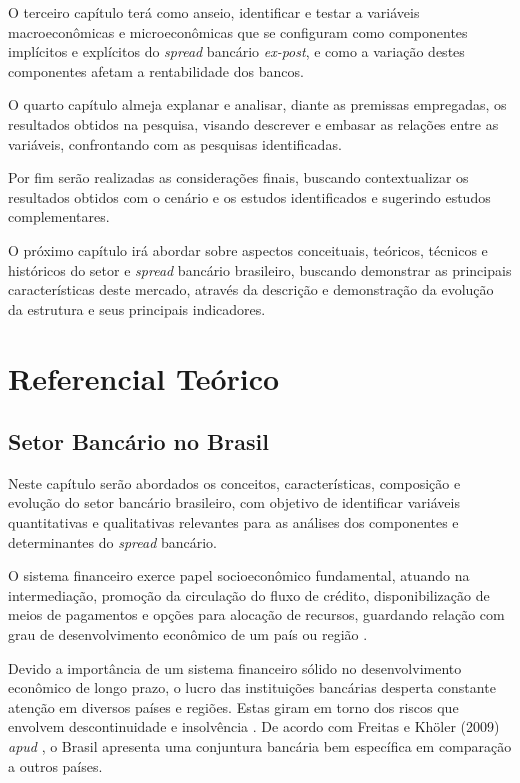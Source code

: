 \documentclass[12pt,12pt,openright,oneside,a4paper,chapter=TITLE,section=TITLE,subsection=TITLE,subsubsection=TITLE,english,french,spanish,portugues,sumario=tradicional]{abntex2}
\begin{document}
O terceiro capítulo terá como anseio, identificar e testar a variáveis macroeconômicas e microeconômicas que se configuram como componentes implícitos e explícitos do \emph{spread} bancário \emph{ex-post}, e como a variação destes componentes afetam a rentabilidade dos bancos.

O quarto capítulo almeja explanar e analisar, diante as premissas empregadas, os resultados obtidos na pesquisa, visando descrever e embasar as relações entre as variáveis, confrontando com as pesquisas identificadas.

Por fim serão realizadas as considerações finais, buscando contextualizar os resultados obtidos com o cenário e os estudos identificados e sugerindo estudos complementares.

O próximo capítulo irá abordar sobre aspectos conceituais, teóricos, técnicos e históricos do setor e \emph{spread} bancário brasileiro, buscando demonstrar as principais características deste mercado, através da descrição e demonstração da evolução da estrutura e seus principais indicadores.

\textual
\pagestyle{simple}

\chapter{Referencial Teórico}

\section{Setor Bancário no Brasil}

Neste capítulo serão abordados os conceitos, características, composição e
evolução do setor bancário brasileiro, com objetivo de identificar variáveis
quantitativas e qualitativas relevantes para as análises dos componentes e
determinantes do \emph{spread} bancário.

O sistema financeiro exerce papel socioeconômico fundamental, atuando na intermediação, promoção da circulação do fluxo de crédito, disponibilização de meios de pagamentos e opções para alocação de recursos, guardando relação com grau de desenvolvimento econômico de um país ou região \cite{maffili:2009}.

Devido a importância de um sistema financeiro sólido no desenvolvimento
econômico de longo prazo, o lucro das instituições bancárias desperta constante
atenção em diversos países e regiões. Estas giram em torno dos riscos que
envolvem descontinuidade e insolvência \cite{couto:2002}. De
acordo com Freitas e Khöler (2009) \emph{apud} \textcite{dantas:2012}, o Brasil
apresenta uma conjuntura bancária bem específica em comparação a outros países.
\end{document}
